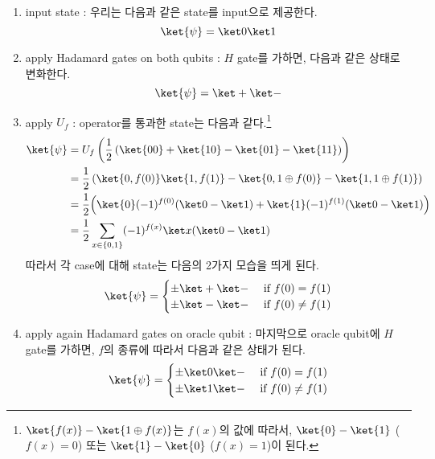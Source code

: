 \begin{enumerate}
  \item input state
  : 우리는 다음과 같은 state를 input으로 제공한다.
  \begin{equation*}
    \ket{\psi} = \ket 0 \ket 1
  \end{equation*}
  \item apply Hadamard gates on both qubits
  : $H$ gate를 가하면, 다음과 같은 상태로 변화한다.
  \begin{equation*}
    \ket{\psi} = \ket + \ket -
  \end{equation*}
  \item apply $U_f$
  : operator를 통과한 state는 다음과 같다.\footnote{$\ket{f(x)} - \ket{1 \oplus f(x)}$는 $f(x)$의 값에 따라서, $\ket{0} - \ket{1}$ ($f(x) = 0$) 또는 $\ket{1} - \ket{0}$ ($f(x) = 1$)이 된다.}
  \begin{align*}
    \ket{\psi} &= U_f\left(\frac{1}{2}\left(\ket{00} + \ket{10} - \ket{01} - \ket{11} \right)\right)\\
                &= \frac{1}{2}\left(\ket{0, f(0)} \ket{1, f(1)} - \ket{0, 1 \oplus f(0)} - \ket{1, 1 \oplus f(1)}\right)\\
                &= \frac{1}{2}\Big(\ket{0}(-1)^{f(0)}(\ket 0 - \ket 1) + \ket{1}(-1)^{f(1)}(\ket 0 - \ket 1) \Big) \\
                &= \frac{1}{2} \sum_{x \in \{0, 1\}}(-1)^{f(x)} \ket x (\ket 0 - \ket 1)
  \end{align*}
  따라서 각 case에 대해 state는 다음의 2가지 모습을 띄게 된다.
  \begin{equation*}
  \ket{\psi} = \begin{cases}
    \pm \ket + \ket - & \text{ if } f(0) = f(1)\\ 
    \pm \ket - \ket - & \text{ if } f(0) \ne f(1)
  \end{cases}
  \end{equation*}
  \item apply again Hadamard gates on oracle qubit
  : 마지막으로 oracle qubit에 $H$ gate를 가하면, $f$의 종류에 따라서 다음과 같은 상태가 된다.
  \begin{equation*}
    \ket{\psi} = \begin{cases}
      \pm \ket 0 \ket - & \text{ if } f(0) = f(1)\\ 
      \pm \ket 1 \ket - & \text{ if } f(0) \ne f(1)
    \end{cases}
  \end{equation*}
\end{enumerate}

